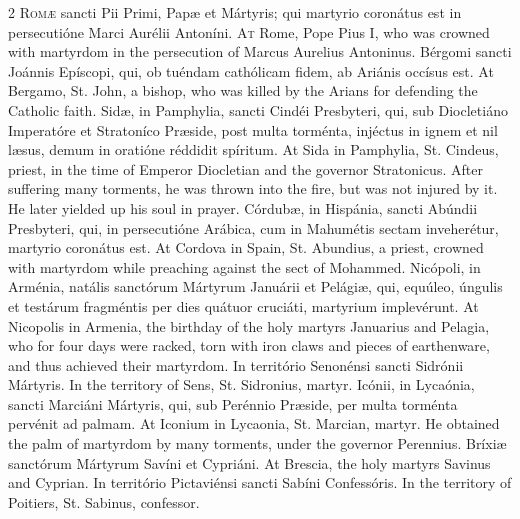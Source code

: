 \begin{paracol}{2}
\lettrine[lines=2]{R}{omæ} sancti Pii Primi, 
 Papæ et Mártyris; qui martyrio coronátus est in persecutióne Marci Aurélii 
 Antoníni.
\switchcolumn
{}
\lettrine[lines=2]{A}{t} Rome, Pope Pius I, who was 
 crowned with martyrdom in the persecution of Marcus Aurelius Antoninus.
\switchcolumn*
{}
Bérgomi sancti Joánnis 
 Epíscopi, qui, ob tuéndam cathólicam fidem, ab Ariánis occísus est.
\switchcolumn
{}
At Bergamo, St. John, a bishop, who 
 was killed by the Arians for defending the Catholic faith.
\switchcolumn*
{}
Sidæ, in Pamphylia, 
 sancti Cindéi Presbyteri, qui, sub Diocletiáno Imperatóre et Stratoníco 
 Præside, post multa torménta, injéctus in ignem et nil læsus, demum in 
 oratióne réddidit spíritum.
\switchcolumn
{}
At Sida in Pamphylia, St. Cindeus, 
 priest, in the time of Emperor Diocletian and the governor Stratonicus. 
 After suffering many torments, he was thrown into the fire, but was not 
 injured by it. He later yielded up his soul in prayer.
\switchcolumn*
{}
Córdubæ, in Hispánia, 
 sancti Abúndii Presbyteri, qui, in persecutióne Arábica, cum in Mahumétis 
 sectam inveherétur, martyrio coronátus est.
\switchcolumn
{}
At Cordova in Spain, St. Abundius, a 
 priest, crowned with martyrdom while preaching against the sect of Mohammed.
\switchcolumn*
{}
Nicópoli, in Arménia, natális sanctórum Mártyrum Januárii et Pelágiæ, qui, equúleo, 
 úngulis et 
 testárum fragméntis per dies quátuor cruciáti, martyrium implevérunt.
\switchcolumn
{}
At Nicopolis in Armenia, the 
 birthday of the holy martyrs Januarius and Pelagia, who for four days were 
 racked, torn with iron claws and pieces of earthenware, and thus achieved 
 their martyrdom.
\switchcolumn*
{}
In território Senonénsi 
 sancti Sidrónii Mártyris.
\switchcolumn
{}
In the territory of Sens, St. 
 Sidronius, martyr.
\switchcolumn*
{}
Icónii, in Lycaónia, 
 sancti Marciáni Mártyris, qui, sub Perénnio Præside, per multa torménta 
 pervénit ad palmam.
\switchcolumn
{}
At Iconium in Lycaonia, St. Marcian, 
 martyr. He obtained the palm of martyrdom by many torments, under the 
 governor Perennius.
\switchcolumn*
{}
Bríxiæ sanctórum 
 Mártyrum Savíni et Cypriáni.
\switchcolumn
{}
At Brescia, the holy martyrs Savinus 
 and Cyprian.
\switchcolumn*
{}
In território 
 Pictaviénsi sancti Sabíni Confessóris.
\switchcolumn
{}
In the territory of Poitiers, St. 
 Sabinus, confessor.
\switchcolumn*
{}
\end{paracol}



